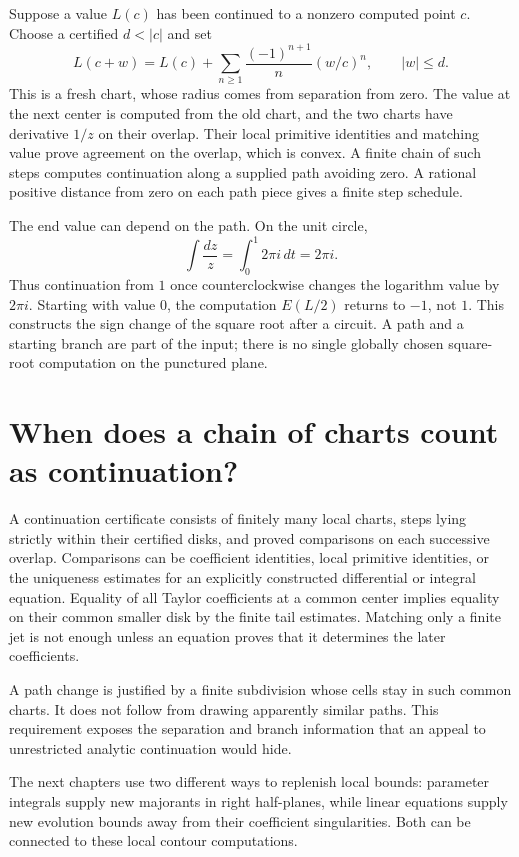 Suppose a value $L(c)$ has been continued to a nonzero computed point $c$.
Choose a certified $d<|c|$ and set
\[
 L(c+w)=L(c)+\sum_{n\ge1}\frac{(-1)^{n+1}}n(w/c)^n,
 \qquad |w|\le d.
\]
This is a fresh chart, whose radius comes from separation from zero.
The value at the next center is computed from the old chart, and the two
charts have derivative $1/z$ on their overlap.  Their local primitive
identities and matching value prove agreement on the overlap, which is
convex.  A finite chain of such steps computes continuation along a
supplied path avoiding zero.  A rational positive distance from zero on
each path piece gives a finite step schedule.

The end value can depend on the path.  On the unit circle,
\[
 \int\frac{dz}{z}=\int_0^1 2\pi i\,dt=2\pi i.
\]
Thus continuation from $1$ once counterclockwise changes the logarithm
value by $2\pi i$.  Starting with value $0$, the computation $E(L/2)$
returns to $-1$, not $1$.  This constructs the sign change of the square
root after a circuit.  A path and a starting branch are part of the input;
there is no single globally chosen square-root computation on the
punctured plane.

\section{When does a chain of charts count as continuation?}
A continuation certificate consists of finitely many local charts, steps
lying strictly within their certified disks, and proved comparisons on
each successive overlap.  Comparisons can be coefficient identities,
local primitive identities, or the uniqueness estimates for an explicitly
constructed differential or integral equation.  Equality of all Taylor
coefficients at a common center implies equality on their common smaller
disk by the finite tail estimates.  Matching only a finite jet is not
enough unless an equation proves that it determines the later coefficients.

A path change is justified by a finite subdivision whose cells stay in
such common charts.  It does not follow from drawing apparently similar
paths.  This requirement exposes the separation and branch information
that an appeal to unrestricted analytic continuation would hide.

The next chapters use two different ways to replenish local bounds:
parameter integrals supply new majorants in right half-planes, while
linear equations supply new evolution bounds away from their coefficient
singularities.  Both can be connected to these local contour computations.


